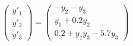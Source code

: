 \documentclass[17pt]{extarticle}
\begin{document}
$$
\begin{pmatrix}
	y'_1\\
	y'_2\\
	y'_3
\end{pmatrix}=
\begin{pmatrix}
	-y_2-y_3\\
	y_1+0.2 y_2\\
	0.2+y_1y_3-5.7 y_3
\end{pmatrix}
$$
\end{document}
